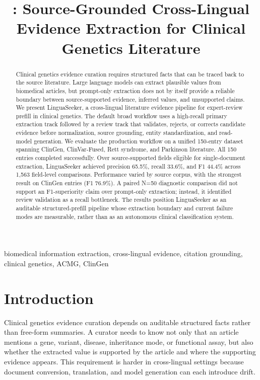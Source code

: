 \documentclass[conference]{IEEEtran}
\title{\methodname: Source-Grounded Cross-Lingual Evidence Extraction for Clinical Genetics Literature}
\author{}
\newcommand{\methodname}{LinguaSeeker}
\newcommand{\bmode}{broad}
\begin{document}
\maketitle
\begin{abstract}
Clinical genetics evidence curation requires structured facts that can be traced back to the source literature. Large language models can extract plausible values from biomedical articles, but prompt-only extraction does not by itself provide a reliable boundary between source-supported evidence, inferred values, and unsupported claims. We present \methodname{}, a cross-lingual literature evidence pipeline for expert-review prefill in clinical genetics. The default \bmode{} workflow uses a high-recall primary extraction track followed by a review track that validates, rejects, or corrects candidate evidence before normalization, source grounding, entity standardization, and read-model generation. We evaluate the production workflow on a unified 150-entry dataset spanning ClinGen, ClinVar-Fused, Rett syndrome, and Parkinson literature. All 150 entries completed successfully. Over source-supported fields eligible for single-document extraction, \methodname{} achieved precision 65.5\%, recall 33.6\%, and F1 44.4\% across 1,563 field-level comparisons. Performance varied by source corpus, with the strongest result on ClinGen entries (F1 76.9\%). A paired N=50 diagnostic comparison did not support an F1-superiority claim over prompt-only extraction; instead, it identified review validation as a recall bottleneck. The results position \methodname{} as an auditable structured-prefill pipeline whose extraction boundary and current failure modes are measurable, rather than as an autonomous clinical classification system.
\end{abstract}

\begin{IEEEkeywords}
biomedical information extraction, cross-lingual evidence, citation grounding, clinical genetics, ACMG, ClinGen
\end{IEEEkeywords}

\section{Introduction}
Clinical genetics evidence curation depends on auditable structured facts rather than free-form summaries. A curator needs to know not only that an article mentions a gene, variant, disease, inheritance mode, or functional assay, but also whether the extracted value is supported by the article and where the supporting evidence appears. This requirement is harder in cross-lingual settings because document conversion, translation, and model generation can each introduce drift.
\end{document}
